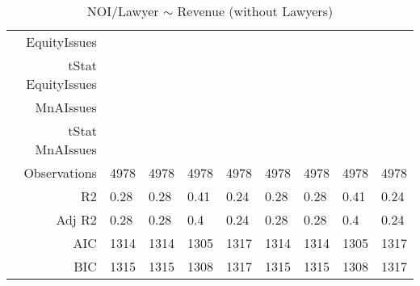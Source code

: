 \begin{table}[ht]
\begin{tabular}{rllllllll}
  EquityIssues &  &  &  &  &  &  &  &  \\ 
  tStat EquityIssues &  &  &  &  &  &  &  &  \\ 
  MnAIssues &  &  &  &  &  &  &  &  \\ 
  tStat MnAIssues &  &  &  &  &  &  &  &  \\ 
  Observations & 4978 & 4978 & 4978 & 4978 & 4978 & 4978 & 4978 & 4978 \\ 
  R2 & 0.28 & 0.28 & 0.41 & 0.24 & 0.28 & 0.28 & 0.41 & 0.24 \\ 
  Adj R2 & 0.28 & 0.28 & 0.4 & 0.24 & 0.28 & 0.28 & 0.4 & 0.24 \\ 
  AIC & 1314 & 1314 & 1305 & 1317 & 1314 & 1314 & 1305 & 1317 \\ 
  BIC & 1315 & 1315 & 1308 & 1317 & 1315 & 1315 & 1308 & 1317 \\ 
   \hline
\end{tabular}
\caption{NOI/Lawyer $\sim$ Revenue (without Lawyers)} 
\end{table}
